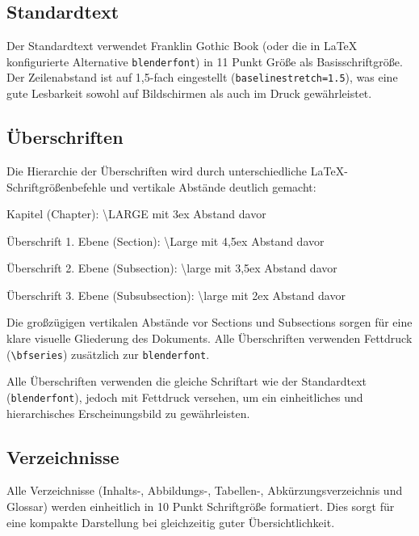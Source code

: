 \subsection*{Standardtext}
\label{subsec:standardtext}

Der Standardtext verwendet Franklin Gothic Book (oder die in \LaTeX{} konfigurierte Alternative \texttt{blenderfont}) in 11 Punkt Größe als Basisschriftgröße. Der Zeilenabstand ist auf 1,5-fach eingestellt (\texttt{baselinestretch=1.5}), was eine gute Lesbarkeit sowohl auf Bildschirmen als auch im Druck gewährleistet.

\subsection*{Überschriften}
\label{subsec:ueberschriften_format}

Die Hierarchie der Überschriften wird durch unterschiedliche \LaTeX{}-Schriftgrößenbefehle und vertikale Abstände deutlich gemacht:
\begin{listenabsatz}
	\item Kapitel (Chapter): \textbackslash LARGE mit 3ex Abstand davor
	\item Überschrift 1. Ebene (Section): \textbackslash Large mit 4,5ex Abstand davor
	\item Überschrift 2. Ebene (Subsection): \textbackslash large mit 3,5ex Abstand davor
	\item Überschrift 3. Ebene (Subsubsection): \textbackslash large mit 2ex Abstand davor
\end{listenabsatz}

Die großzügigen vertikalen Abstände vor Sections und Subsections sorgen für eine klare visuelle Gliederung des Dokuments. Alle Überschriften verwenden Fettdruck (\texttt{\textbackslash bfseries}) zusätzlich zur \texttt{blenderfont}.

Alle Überschriften verwenden die gleiche Schriftart wie der Standardtext (\texttt{blenderfont}), jedoch mit Fettdruck versehen, um ein einheitliches und hierarchisches Erscheinungsbild zu gewährleisten.

\subsection*{Verzeichnisse}
\label{subsec:verzeichnisse_format}

Alle Verzeichnisse (Inhalts-, Abbildungs-, Tabellen-, Abkürzungsverzeichnis und Glossar) werden einheitlich in 10 Punkt Schriftgröße formatiert. Dies sorgt für eine kompakte Darstellung bei gleichzeitig guter Übersichtlichkeit.

